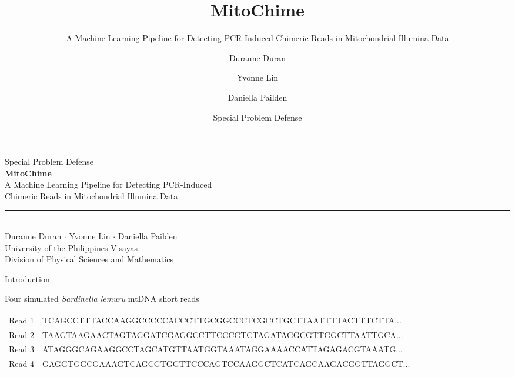 \documentclass[aspectratio=169,11pt]{beamer}
\title[MitoChime]{MitoChime}
\subtitle{A Machine Learning Pipeline for Detecting PCR-Induced Chimeric Reads in Mitochondrial Illumina Data}
\author{
Duranne Duran \and
Yvonne Lin \and
Daniella Pailden
}
\institute{
University of the Philippines Visayas\\
Division of Physical Sciences and Mathematics
}
\date{Special Problem Defense}
\newcommand{\presenters}{Duranne Duran \quad $\cdot$ \quad Yvonne Lin \quad $\cdot$ \quad Daniella Pailden}
\begin{document}
{
\begin{frame}[plain]
\vspace{1.1cm}

\begin{center}
{\Large \textcolor{MitoSlate}{Special Problem Defense}}\\[1.2em]

{\Huge \textbf{MitoChime}}\\[0.6em]

{\large A Machine Learning Pipeline for Detecting PCR-Induced}\\
{\large Chimeric Reads in Mitochondrial Illumina Data}\\[1.6em]

\rule{0.65\linewidth}{0.5pt}\\[1.2em]

{\normalsize
\presenters
}\\[0.7em]

{\small
University of the Philippines Visayas\\
Division of Physical Sciences and Mathematics
}

\end{center}
\end{frame}
}

\begin{frame}{Introduction}

\centering

\begin{block}{Four simulated \textit{Sardinella lemuru} mtDNA short reads}
\small
\ttfamily
\begin{tabular}{p{} p{}}
Read 1 &
TCAGCCTTTACCAAGGCCCCCACCCTTGCGGCCCTCGCCTGCTTAATTTTACTTTCTTA... \\[0.8em]

Read 2 &
TAAGTAAGAACTAGTAGGATCGAGGCCTTCCCGTCTAGATAGGCGTTGGCTTAATTGCA... \\[0.8em]

Read 3 &
ATAGGGCAGAAGGCCTAGCATGTTAATGGTAAATAGGAAAACCATTAGAGACGTAAATG... \\[0.8em]

Read 4 &
GAGGTGGCGAAAGTCAGCGTGGTTCCCAGTCCAAGGCTCATCAGCAAGACGGTTAGGCT...
\end{tabular}
\end{block}

\vspace{0.6em}

\end{frame}
\end{document}
